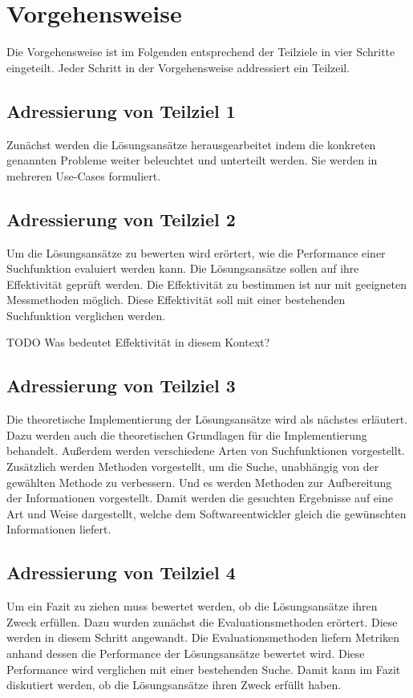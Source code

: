 \section{Vorgehensweise}
Die Vorgehensweise ist im Folgenden entsprechend der Teilziele in vier Schritte eingeteilt.
Jeder Schritt in der Vorgehensweise addressiert ein Teilzeil.

\subsection*{Adressierung von Teilziel 1}
Zunächst werden die Lösungsansätze herausgearbeitet indem die konkreten genannten Probleme weiter beleuchtet und unterteilt werden.
Sie werden in mehreren Use-Cases formuliert.

\subsection*{Adressierung von Teilziel 2}
Um die Lösungsansätze zu bewerten wird erörtert, wie die Performance einer Suchfunktion evaluiert werden kann.
Die Lösungsansätze sollen auf ihre Effektivität geprüft werden.
Die Effektivität zu bestimmen ist nur mit geeigneten Messmethoden möglich.
Diese Effektivität soll mit einer bestehenden Suchfunktion verglichen werden.

TODO Was bedeutet Effektivität in diesem Kontext?

\subsection*{Adressierung von Teilziel 3}
Die theoretische Implementierung der Lösungsansätze wird als nächstes erläutert.
Dazu werden auch die theoretischen Grundlagen für die Implementierung behandelt.
Außerdem werden verschiedene Arten von Suchfunktionen vorgestellt.
Zusätzlich werden Methoden vorgestellt, um die Suche, unabhängig von der gewählten Methode zu verbessern.
Und es werden Methoden zur Aufbereitung der Informationen vorgestellt.
Damit werden die gesuchten Ergebnisse auf eine Art und Weise dargestellt, welche dem Softwareentwickler gleich die gewünschten Informationen liefert.

\subsection*{Adressierung von Teilziel 4}
Um ein Fazit zu ziehen muss bewertet werden, ob die Lösungsansätze ihren Zweck erfüllen.
Dazu wurden zunächst die Evaluationsmethoden erörtert.
Diese werden in diesem Schritt angewandt.
Die Evaluationsmethoden liefern Metriken anhand dessen die Performance der Lösungsansätze bewertet wird.
Diese Performance wird verglichen mit einer bestehenden Suche.
Damit kann im Fazit diskutiert werden, ob die Lösungsansätze ihren Zweck erfüllt haben.

